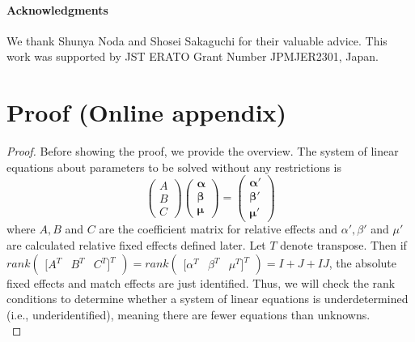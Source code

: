 \documentclass[12pt]{article}
\begin{document}
\paragraph{Acknowledgments}
We thank Shunya Noda and Shosei Sakaguchi for their valuable advice. This work was supported by JST ERATO Grant Number JPMJER2301, Japan.







\appendix
\section{Proof (Online appendix)}\label{sec:proof}
\begin{proof}
    Before showing the proof, we provide the overview. The system of linear equations about parameters to be solved without any restrictions is
    \begin{equation*}
        \begin{pmatrix}
            A \\ B \\ C
        \end{pmatrix}
        \begin{pmatrix}
            \mathbf{\alpha} \\ \mathbf{\beta} \\ \mathbf{\mu}
        \end{pmatrix}=
        \begin{pmatrix}
            \mathbf{\alpha'} \\ \mathbf{\beta'} \\ \mathbf{\mu'}
        \end{pmatrix}
    \end{equation*}
    where $A, B$ and $C$ are the coefficient matrix for relative effects and $\alpha',\beta'$ and $\mu'$ are calculated relative fixed effects defined later.
    Let $T$ denote transpose.
    Then if $rank\begin{pmatrix}
        [A^T&B^T&C^T]^T
    \end{pmatrix}=rank\begin{pmatrix}
        [\alpha^T&\beta^T&\mu^T]^T
    \end{pmatrix}=I+J+IJ$, the absolute fixed effects and match effects are just identified. Thus, we will check the rank conditions to determine whether a system of linear equations is underdetermined (i.e., underidentified), meaning there are fewer equations than unknowns.\\

\end{proof}
\end{document}
